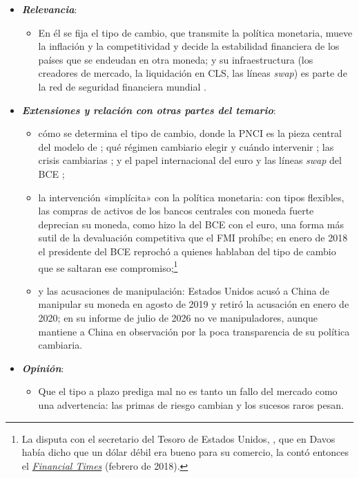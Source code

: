 \documentclass[11pt]{article}
\begin{document}
\begin{itemize}
\begin{itemize}
  \item El arbitraje impone la paridad cubierta de intereses; la especulación, en el mejor de los casos, la no cubierta, que falla en los datos.
  \end{itemize}
\item \textbf{\emph{Relevancia}}:
  \begin{itemize}
  \item En él se fija el tipo de cambio, que transmite la política monetaria, mueve la inflación y la competitividad y decide la estabilidad financiera de los países que se endeudan en otra moneda; y su infraestructura (los creadores de mercado, la liquidación en CLS, las líneas \emph{swap}) es parte de la red de seguridad financiera mundial .
  \end{itemize}
\item \textbf{\emph{Extensiones y relación con otras partes del temario}}:
  \begin{itemize}
  \item cómo se determina el tipo de cambio, donde la PNCI es la pieza central del modelo de  ; qué régimen cambiario elegir y cuándo intervenir ; las crisis cambiarias ; y el papel internacional del euro y las líneas \emph{swap} del BCE ;
  \item la intervención «implícita» con la política monetaria: con tipos flexibles, las compras de activos de los bancos centrales con moneda fuerte deprecian su moneda, como hizo la del BCE con el euro\nocite{DedolaEtAl2021Bazooka}, una forma más sutil de la devaluación competitiva que el FMI prohíbe; en enero de 2018 el presidente del BCE reprochó a quienes hablaban del tipo de cambio que se saltaran ese compromiso\nocite{BCE2018Draghi};\footnote{La disputa con el secretario del Tesoro de Estados Unidos, , que en Davos había dicho que un dólar débil era bueno para su comercio, la contó entonces el \href{https://www.ft.com/content/2af0a718-17ce-11e8-9e9c-25c814761640}{\emph{Financial Times}} (febrero de 2018).}
  \item y las acusaciones de manipulación: Estados Unidos acusó a China de manipular su moneda en agosto de 2019 y retiró la acusación en enero de 2020\nocite{Tesoro2019China,Tesoro2020FX}; en su informe de julio de 2026 no ve manipuladores, aunque mantiene a China en observación por la poca transparencia de su política cambiaria\nocite{Tesoro2026FX}.
  \end{itemize}
\item \textbf{\emph{Opinión}}:
  \begin{itemize}
  \item Que el tipo a plazo prediga mal no es tanto un fallo del mercado como una advertencia: las primas de riesgo cambian y los sucesos raros pesan.


\end{itemize}
\end{itemize}
\end{document}
